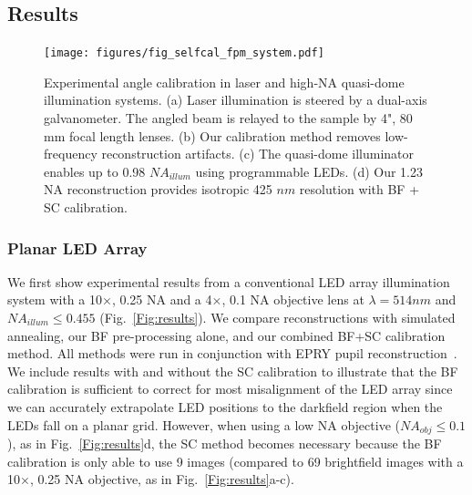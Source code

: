 \subsection{Results}

\begin{figure} [t]
	\centering
	\texttt{[image: figures/fig\_selfcal\_fpm\_system.pdf]}
	\caption{Experimental angle calibration in laser and high-NA quasi-dome illumination systems. (a) Laser illumination is steered by a dual-axis galvanometer. The angled beam is relayed to the sample by 4", 80 mm focal length lenses. (b) Our calibration method removes low-frequency reconstruction artifacts. (c) The quasi-dome illuminator enables up to 0.98 $NA_{illum}$ using programmable LEDs. (d) Our 1.23 NA reconstruction provides isotropic 425 $nm$ resolution with BF + SC calibration.
		}
	\label{Fig:laserDome}
\end{figure}

\subsubsection{Planar LED Array}
We first show experimental results from a conventional LED array illumination system with a 10$\times$, 0.25 NA and a 4$\times$, 0.1 NA objective lens at $\lambda = 514 nm$ and $NA_{illum} \leq 0.455$ (Fig.~\ref{Fig:results}). We compare reconstructions with simulated annealing, our BF pre-processing alone, and our combined BF+SC calibration method. All methods were run in conjunction with EPRY pupil reconstruction~\cite{Ou:14}. We include results with and without the SC calibration to illustrate that the BF calibration is sufficient to correct for most misalignment of the LED array since we can accurately extrapolate LED positions to the darkfield region when the LEDs fall on a planar grid. However, when using a low NA objective ($NA_{obj} \leq 0.1$), as in Fig.~\ref{Fig:results}d, the SC method becomes necessary because the BF calibration is only able to use 9 images (compared to 69 brightfield images with a 10$\times$, 0.25 NA objective, as in Fig.~\ref{Fig:results}a-c).

